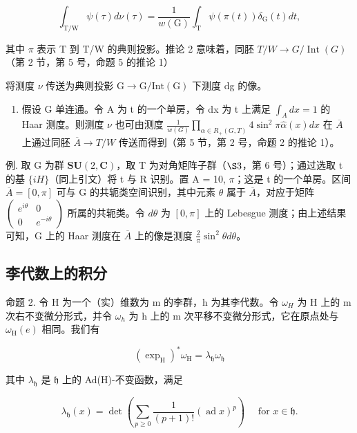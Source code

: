 \[
\int_ {\mathrm{T/W}} \psi (\tau) d \nu (\tau) = \frac {1}{w (\mathrm{G})} \int_ {\mathrm{T}} \psi (\pi (t)) \delta_ {\mathrm{G}} (t) d t,
\]

其中 \(\pi\) 表示 T 到 T/W 的典则投影。推论 2 意味着，同胚 \(T / W \to G / \operatorname{Int}(G)\)（第 2 节，第 5 号，命题 5 的推论 1）

将测度 \(\nu\) 传送为典则投影 \(\mathrm{G} \rightarrow \mathrm{G}/\mathrm{Int}(\mathrm{G})\) 下测度 dg 的像。

\begin{enumerate}
\def\labelenumi{\arabic{enumi})}
\setcounter{enumi}{2}
\tightlist
\item
  假设 G 单连通。令 A 为 t 的一个单房，令 dx 为 t 上满足 \(\int_{A} dx = 1\) 的 Haar 测度。则测度 \(\nu\) 也可由测度 \(\frac{1}{w(G)} \prod_{\alpha \in R_{+}(G,T)} 4 \sin^{2} \pi \hat{\alpha}(x) dx\) 在 \(\overline{A}\) 上通过同胚 \(\overline{A} \rightarrow T/W\) 传送而得到（第 5 节，第 2 号，命题 2 的推论 1）。
\end{enumerate}

例. 取 G 为群 \(\mathbf{SU}(2,\mathbf{C})\)，取 T 为对角矩阵子群（\(\S3\)，第 6 号）；通过选取 t 的基 \(\{iH\}\)（同上引文）将 t 与 R 识别。置 A = 10, \(\pi\)；这是 t 的一个单房。区间 \(\overline{A} = [0, \pi]\) 可与 G 的共轭类空间识别，其中元素 \(\theta\) 属于 \(\overline{A}\)，对应于矩阵 \(\begin{pmatrix} e^{i\theta} & 0 \\ 0 & e^{-i\theta} \end{pmatrix}\) 所属的共轭类。令 \(d\theta\) 为 \([0, \pi]\) 上的 Lebesgue 测度；由上述结果可知，G 上的 Haar 测度在 \(\overline{A}\) 上的像是测度 \(\frac{2}{\pi}\sin^{2}\theta d\theta\)。

\subsection{李代数上的积分}

命题 2. 令 H 为一个（实）维数为 m 的李群，h 为其李代数。令 \(\omega_{H}\) 为 H 上的 m 次右不变微分形式，并令 \(\omega_{h}\) 为 h 上的 m 次平移不变微分形式，它在原点处与 \(\omega_{\mathrm{H}}(e)\) 相同。我们有

\[
(\exp_ {\mathrm{H}}) ^ {*} \omega_ {\mathrm{H}} = \lambda_ {\mathfrak {h}} \omega_ {\mathfrak {h}}\tag{10}
\]

其中 \(\lambda_{\mathfrak{h}}\) 是 \(\mathfrak{h}\) 上的 Ad(H)-不变函数，满足

\[
\lambda_ {\mathfrak {h}} (x) = \det \left(\sum_ {p \geq 0} \frac {1}{(p + 1) !} (\operatorname{ad} x) ^ {p}\right) \quad \text { for } x \in \mathfrak {h}.
\]

